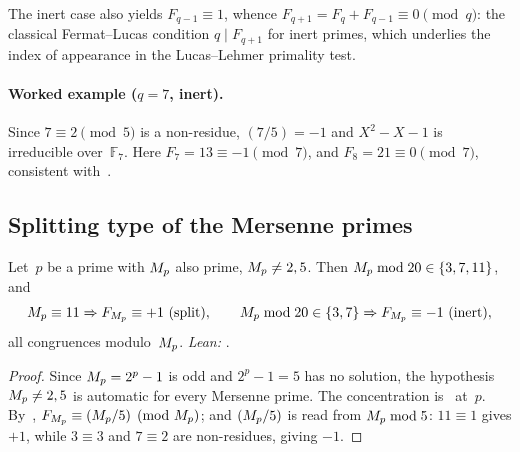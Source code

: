 \begin{Remark}\label{rem:fib-companion}
The inert case also yields $F_{q-1}\equiv1$, whence
$F_{q+1}=F_{q}+F_{q-1}\equiv0\pmod{q}$: the classical Fermat--Lucas
condition $q\mid F_{q+1}$ for inert primes, which underlies the index of
appearance in the Lucas--Lehmer primality test.
\end{Remark}

\paragraph{Worked example ($q=7$, inert).}
Since $7\equiv2\pmod5$ is a non-residue, $(7/5)=-1$ and $X^{2}-X-1$ is
irreducible over~$\mathbb{F}_{7}$.  Here $F_{7}=13\equiv-1\pmod{7}$, and
$F_{8}=21\equiv0\pmod7$, consistent with~.

\subsection{Splitting type of the Mersenne primes}
\label{ssec:fib-mersenne}

\begin{Theorem}\label{thm:residue-split}
Let~$p$ be a prime with $M_{p}$ also prime, $M_{p}\neq2,5$.  Then
$M_{p}\bmod20\in\{3,7,11\}$, and
\[
  \Mp\equiv11\Rightarrow F_{\Mp}\equiv+1\ (\text{split}),
  \qquad
  \Mp\bmod20\in\{3,7\}\Rightarrow F_{\Mp}\equiv-1\ (\text{inert}),
\]
all congruences modulo~$M_{p}$.
\emph{Lean:} .
\end{Theorem}

\begin{proof}
Since $M_{p}=2^{p}-1$ is odd and $2^{p}-1=5$ has no solution, the hypothesis $M_{p}\neq2,5$ is automatic for every Mersenne prime.  The concentration is~ at~$p$.
By~, $F_{M_{p}}\equiv(M_{p}/5)\pmod{M_{p}}$; and
$(M_{p}/5)$ is read from $M_{p}\bmod5$: $11\equiv1$ gives $+1$, while
$3\equiv3$ and $7\equiv2$ are non-residues, giving $-1$.
\end{proof}

